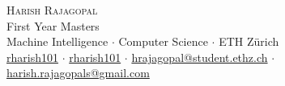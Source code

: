 \newcommand{\sep}{$\cdot$}%
\newcommand{\gmail}{harish.rajagopals@gmail.com}
\newcommand{\ethzmail}{hrajagopal@student.ethz.ch}

\begin{center}

\textsc{\huge Harish Rajagopal}\\[2mm]
First Year Masters\\[1mm]
Machine Intelligence \sep{} Computer Science \sep{} ETH Zürich\\[1mm]
\faGithub{} \href{https://github.com/rharish101}{rharish101} \sep{}
\faLinkedinSquare{} \href{https://www.linkedin.com/in/rharish101/}{rharish101} \sep{}
\faEnvelopeO{} \href{mailto:\ethzmail}{\ethzmail} \sep{}
\faEnvelopeO{} \href{mailto:\gmail}{\gmail}

\end{center}
